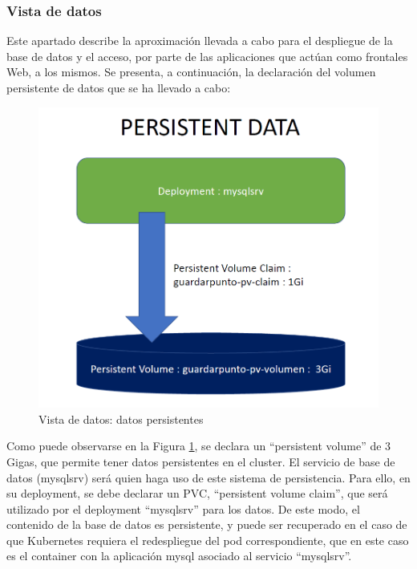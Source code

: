 \documentclass[12pt,spanish]{article}
\begin{document}
\subsubsection{Vista de datos}
Este apartado describe la aproximación llevada a cabo para el despliegue de la base de datos y el acceso, por parte de las aplicaciones que actúan como frontales Web, a los mismos.
Se presenta, a continuación, la declaración del volumen persistente de datos que se ha llevado a cabo:
\begin{center}
 \begin{figure}[H]
 \begin{center}
   \includegraphics[width=16cm]{img/persistentData00.png}
   \caption{Vista de datos: datos persistentes}
   \label{fig:persistentData00}
 \end{center}
 \end{figure}
\end{center}
Como puede observarse en la Figura \ref{fig:persistentData00}, se declara un ``persistent volume'' de 3 Gigas, que permite tener datos persistentes en el cluster. El servicio de base de datos (mysqlsrv) será quien haga uso de este sistema de persistencia. Para ello, en su deployment, se debe declarar un PVC, ``persistent volume claim'', que será utilizado por el deployment ``mysqlsrv'' para los datos. De este modo, el contenido de la base de datos es persistente, y puede ser recuperado en el caso de que Kubernetes requiera el redespliegue del pod correspondiente, que en este caso es el container con la aplicación mysql asociado al servicio ``mysqlsrv''.\\
\end{document}

